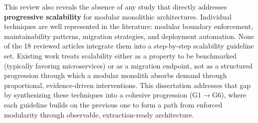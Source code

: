 This review also reveals the absence of any study that directly addresses \textbf{progressive scalability} for modular monolithic architectures. Individual techniques are well represented in the literature: modular boundary enforcement, maintainability patterns, migration strategies, and deployment automation. None of the 18 reviewed articles integrate them into a step-by-step scalability guideline set. Existing work treats scalability either as a property to be benchmarked (typically favoring microservices) or as a migration endpoint, not as a structured progression through which a modular monolith absorbs demand through proportional, evidence-driven interventions. This dissertation addresses that gap by synthesizing these techniques into a cohesive progression (G1$\rightarrow$G6), where each guideline builds on the previous one to form a path from enforced modularity through observable, extraction-ready architecture.

